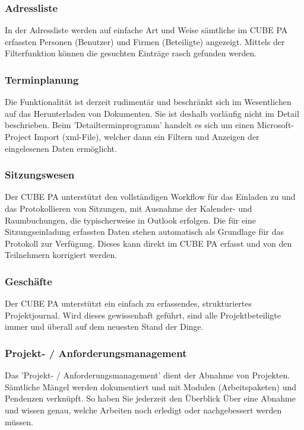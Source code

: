 \pagebreak
\subsubsection{Adressliste}

In der Adressliste werden auf einfache Art und Weise sämtliche im CUBE PA erfassten Personen (Benutzer) und Firmen (Beteiligte) angezeigt. Mittels der Filterfunktion können die gesuchten Einträge rasch gefunden werden.

\subsubsection{Terminplanung}

Die Funktionalität ist derzeit rudimentär und beschränkt sich im Wesentlichen auf das Herunterladen von Dokumenten. Sie ist deshalb vorläufig nicht im Detail beschrieben. Beim 'Detailterminprogramm' handelt es sich um einen Microsoft-Project Import (xml-File), welcher dann ein Filtern und Anzeigen der eingelesenen Daten ermöglicht.

\subsubsection{Sitzungswesen}

Der CUBE PA unterstützt den vollständigen Workflow für das Einladen zu und das Protokollieren von Sitzungen, mit Ausnahme der Kalender- und Raumbuchungen, die typischerweise in Outlook erfolgen. Die für eine Sitzungseinladung erfassten Daten stehen automatisch als Grundlage für das Protokoll zur Verfügung. Dieses kann direkt im CUBE PA erfasst und von den Teilnehmern korrigiert werden.

\subsubsection{Geschäfte}

Der CUBE PA unterstützt ein einfach zu erfassendes, strukturiertes Projektjournal. Wird dieses gewissenhaft geführt, sind alle Projektbeteiligte immer und überall auf dem neuesten Stand der Dinge.

\subsubsection{Projekt- / Anforderungsmanagement}

Das 'Projekt- / Anforderungsmanagement' dient der Abnahme von Projekten. Sämtliche Mängel werden dokumentiert und mit Modulen (Arbeitspaketen) und Pendenzen verknüpft. So haben Sie jederzeit den Überblick Über eine Abnahme und wissen genau, welche Arbeiten noch erledigt oder nachgebessert werden müssen.

